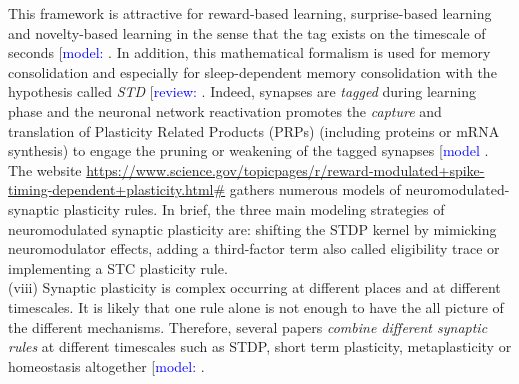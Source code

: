 This framework is attractive for reward-based learning, surprise-based learning and novelty-based learning in the sense that the tag exists on the timescale of seconds [\textcolor{blue}{model:} \cite{nakano_kinetic_2010, zannone_acetylcholine-modulated_2018, ang_functional_2021}. In addition, this mathematical formalism is used for memory consolidation and especially for sleep-dependent memory consolidation with the hypothesis called \textit{\acrfull{STD}} [\textcolor{blue}{review:} \cite{seibt_primed_2019}. Indeed, synapses are \textit{tagged} during learning phase and the neuronal network reactivation promotes the \textit{capture} and translation of Plasticity Related Products (PRPs) (including proteins or mRNA synthesis) to engage the pruning or weakening of the tagged synapses [\textcolor{blue}{model} \cite{luboeinski_memory_2021, ziegler_synaptic_2015, clopath_tag-trigger-consolidation_2008, clopath_synaptic_2012}. The website \url{https://www.science.gov/topicpages/r/reward-modulated+spike-timing-dependent+plasticity.html#} gathers numerous models of neuromodulated-synaptic plasticity rules. In brief, the three main modeling strategies of neuromodulated synaptic plasticity are: shifting the STDP kernel by mimicking neuromodulator effects, adding a third-factor term also called eligibility trace or implementing a STC plasticity rule.  \\


(viii) Synaptic plasticity is complex occurring at different places and at different timescales. It is likely that one rule alone is not enough to have the all picture of the different mechanisms. Therefore, several papers \textit{combine different synaptic rules} at different timescales such as STDP, short term plasticity, metaplasticity or homeostasis altogether [\textcolor{blue}{model:} \cite{honnuraiah_calcium-dependent_2013, bannon_adenosine_2017, fauth_self-organized_2019, zenke_diverse_2015, farries_reinforcement_2007, wu_homeostatic_2020,  el_boustani_stable_2012, nere_sleep-dependent_2013, vignoud_interplay_2018}.



